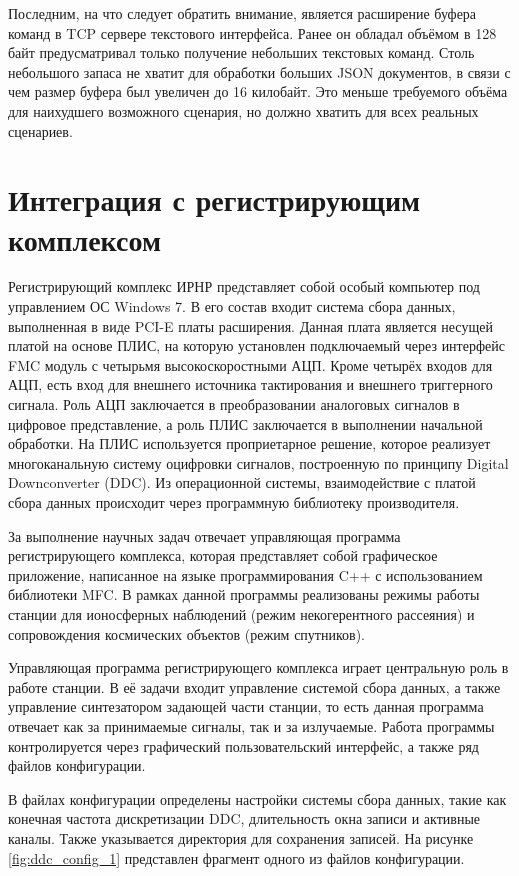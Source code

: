\documentclass{report}
\begin{document}
Последним, на что следует обратить внимание, является расширение буфера команд в TCP сервере текстового интерфейса. Ранее он обладал объёмом в 128 байт предусматривал только получение небольших текстовых команд. Столь небольшого запаса не хватит для обработки больших JSON документов, в связи с чем размер буфера был увеличен до 16 килобайт. Это меньше требуемого объёма для наихудшего возможного сценария, но должно хватить для всех реальных сценариев.

\section{Интеграция с регистрирующим комплексом}

Регистрирующий комплекс ИРНР представляет собой особый компьютер под управлением ОС Windows 7. В его состав входит система сбора данных, выполненная в виде PCI-E платы расширения. Данная плата является несущей платой на основе ПЛИС, на которую установлен подключаемый через интерфейс FMC модуль с четырьмя высокоскоростными АЦП. Кроме четырёх входов для АЦП, есть вход для внешнего источника тактирования и внешнего триггерного сигнала. Роль АЦП заключается в преобразовании аналоговых сигналов в цифровое представление, а роль ПЛИС заключается в выполнении начальной обработки. На ПЛИС используется проприетарное решение, которое реализует многоканальную систему оцифровки сигналов, построенную по принципу Digital Downconverter (DDC). Из операционной системы, взаимодействие с платой сбора данных происходит через программную библиотеку производителя.

За выполнение научных задач отвечает управляющая программа регистрирующего комплекса, которая представляет собой графическое приложение, написанное на языке программирования C++ с использованием библиотеки MFC. В рамках данной программы реализованы режимы работы станции для ионосферных наблюдений (режим некогерентного рассеяния) и сопровождения космических объектов (режим спутников).

Управляющая программа регистрирующего комплекса играет центральную роль в работе станции. В её задачи входит управление системой сбора данных, а также управление синтезатором задающей части станции, то есть данная программа отвечает как за принимаемые сигналы, так и за излучаемые. Работа программы контролируется через графический пользовательский интерфейс, а также ряд файлов конфигурации.

В файлах конфигурации определены настройки системы сбора данных, такие как конечная частота дискретизации DDC, длительность окна записи и активные каналы. Также указывается директория для сохранения записей. На рисунке \ref{fig:ddc_config_1} представлен фрагмент одного из файлов конфигурации.
\end{document}
